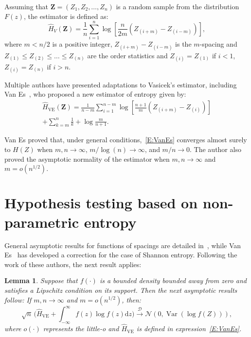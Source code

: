 \documentclass[conference]{IEEEtran}
\newtheorem{lemma}{Lemma}
\begin{document}
Assuming that  $\bm{Z}=(Z_1, Z_2, \ldots,Z_n)$ is a random sample from the distribution $F(z)$, the estimator is defined as:
\begin{equation*}
	\widehat{H}_{V}(\bm{Z})=\frac{1}{n}\sum_{i=1}^{n}\log\left[\frac{n}{2m}\left(Z_{(i+m)}-Z_{(i-m)}\right)\right],
	\end{equation*}
where $m<n/2$ is a positive integer, $Z_{(i+m)}-Z_{(i-m)}$ is the $m$-spacing and $Z_{(1)}\leq Z_{(2)}\leq\ldots\leq Z_{(n)}$ are the order statistics and $Z_{(i)}= Z_{(1)}$ if $i<1$, $Z_{(i)}= Z_{(n)}$ if $i>n$.

Multiple authors have presented  adaptations to Vasicek's estimator, including Van Es~\cite{Bert1992}, who proposed a new estimator of entropy given by:
\begin{multline}
\label{E:VanEs}
	\widehat{H}_{\text{VE}}(\bm{Z})=\frac{1}{n-m}\sum_{i=1}^{n-m}\log\left[\frac{n+1}{m}\left(Z_{(i+m)}-Z_{(i)}\right)\right]\\
	+\sum_{k=m}^n\frac{1}{k}+\log\frac{m}{n+1}.
\end{multline}

Van Es proved that, under general conditions,~\eqref{E:VanEs} converges almost surely to $H(Z)$ when $m, n\rightarrow\infty$,  $m/ \log(n)\rightarrow\infty$, and $m/n \rightarrow0$.
The author also proved the asymptotic normality of the estimator when $m, n\rightarrow\infty$ and $m=o(n^{1/2})$.
\section{Hypothesis testing based on non-parametric entropy}

General asymptotic results for functions of spacings are detailed in~\cite{Khashimov1990}, while Van Es~\cite{Bert1992} has developed a correction for the case of Shannon entropy.
Following the work of these authors, the next result applies: 

\begin{lemma}
Suppose that $f(\cdot)$ is a bounded density bounded away from zero and satisfies a Lipschitz condition on its support.
Then the next asymptotic results follow: If $m,n\rightarrow \infty$ and $m=o(n^{1/2})$, then:
$$
\sqrt{n}\,\Big(\widehat{H}_{\text{VE}}+\int_{-\infty}^\infty f(z)\log f(z) \mathrm{d}z\Big)
\xrightarrow[]{\mathcal{D}}
\mathcal{N}(0,\operatorname{Var}(\log f(Z))),
$$
where $o(\cdot)$ represents the little-o and $\widehat{H}_{\text{VE}}$ is defined in expression~\eqref{E:VanEs}.

\end{lemma} 
\end{document}
